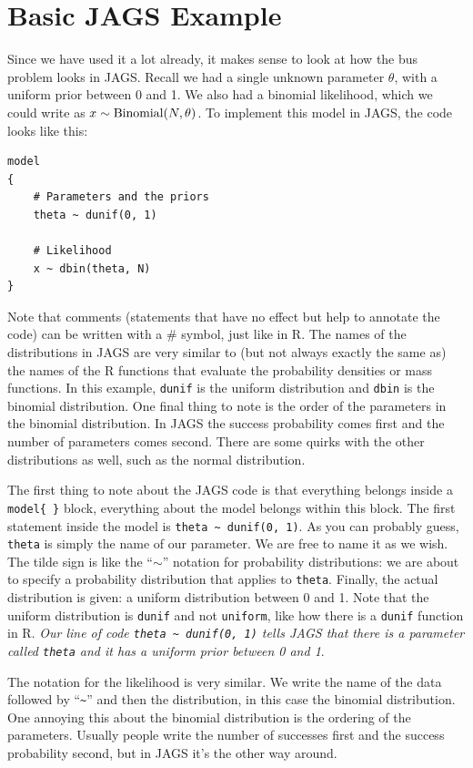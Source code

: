 \section{Basic JAGS Example}
Since we have used it a lot already, it makes sense to look at how the bus
problem looks in JAGS. Recall we had a
single unknown parameter $\theta$, with a uniform prior between 0 and 1.
We also had a binomial likelihood, which we could write as
$x \sim \textnormal{Binomial}(N, \theta)$.
To implement this model in JAGS, the code looks like this:
\begin{framed}
\begin{verbatim}
model
{
    # Parameters and the priors
    theta ~ dunif(0, 1)

    # Likelihood
    x ~ dbin(theta, N)
}
\end{verbatim}
\end{framed}
Note that comments (statements that have no effect but help to annotate the
code) can be written with a \# symbol, just like in R.
The names of the distributions in JAGS are very similar to (but not always
exactly the same as) the names of the R functions that evaluate the probability
densities or mass functions. In this example, {\tt dunif} is the uniform
distribution and {\tt dbin} is the binomial distribution. One final thing to
note is the order of the parameters in the binomial distribution. In JAGS the
success probability comes first and the number of parameters comes second.
There are some quirks with the other distributions as well, such as the normal
distribution.

The first thing to note about the JAGS code is that everything belongs inside
a {\tt model\{   \}} block, everything about the model belongs within this
block.
The first statement inside the model is {\tt theta \~{ } dunif(0, 1)}. As you
can probably guess, {\tt theta}
is simply the name of our parameter. We are free to name it as we
wish. The tilde sign is like the ``$\sim$'' notation for probability distributions: we are
about to specify a probability distribution that applies to {\tt theta}. Finally,
the actual distribution is given: a uniform distribution between 0 and 1. Note
that the uniform distribution is {\tt dunif} and not {\tt uniform}, like how
there is a {\tt dunif} function in R. {\it Our line of code {\tt theta \~{ } dunif(0, 1)}
tells JAGS
that there is a parameter called {\tt theta} and it has a uniform prior between
0 and 1}.

The notation for the likelihood is very similar. We write the name of the data
followed by ``{\tt \~{ }}'' and then the distribution, in this case the
binomial distribution.
One annoying this about the binomial distribution is the ordering of the parameters.
Usually people write the number of successes first and the success probability
second, but in JAGS it's the other way around.


